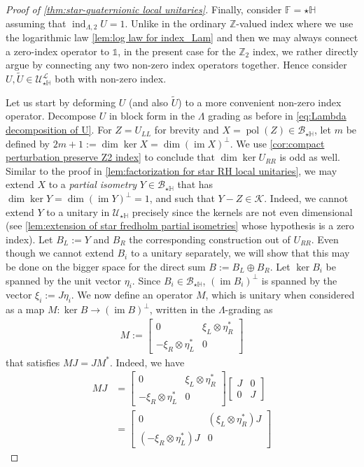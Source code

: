 \documentclass[a4paper,10pt]{article}
\numberwithin{equation}{section}
\theoremstyle{plain}
\theoremstyle{plain}
\theoremstyle{plain}
\theoremstyle{plain}
\theoremstyle{plain}
\theoremstyle{remark}
\theoremstyle{definition}
\theoremstyle{plain}
\newcommand{\ZZ}{\mathbb{Z}}
\newcommand{\FF}{\mathbb{F}}
\newcommand{\calB}{\mathcal{B}}
\newcommand{\calU}{\mathcal{U}}
\newcommand{\calK}{\mathcal{K}}
\newcommand{\calL}{\mathcal{L}}
\newcommand{\ti}[1]{\widetilde{#1}}
\newcommand{\Id}{\mathds{1}}
\newcommand{\HH}{\mathbb{H}}
\newcommand{\findex}{\operatorname{ind}}
\newcommand{\im}{\operatorname{im}}
\newcommand{\eq}[1]{\begin{align*}#1\end{align*}}
\newcommand{\polar}{\operatorname{pol}}
\begin{document}
\begin{proof}[Proof of \cref{thm:star-quaternionic local unitaries}]
		Finally, consider $\FF=\star\HH$ assuming that $\findex_{\Lambda,2} U=1$. Unlike in the ordinary $\ZZ$-valued index where we use the logarithmic law \cref{lem:log law for index_Lam} and then we may always connect a zero-index operator to $\Id$, in the present case for the $\ZZ_2$ index, we rather directly argue by connecting any two non-zero index operators together. Hence consider $U,\widetilde{U}\in\calU_{\star\HH}^\calL$ both with non-zero index.   
		
		Let us start by deforming $U$ (and also $\ti U$) to a more convenient non-zero index operator. Decompose $U$ in block form in the $\Lambda$ grading as before in \cref{eq:Lambda decomposition of U}. For $Z=U_{LL}$ for brevity and $X=\polar(Z)\in\calB_{\star\HH}$, let $m$ be defined by  $2m+1:=\dim\ker X=\dim (\im X)^\perp $. We use \cref{cor:compact perturbation preserve Z2 index} to conclude that $\dim\ker U_{RR}$ is odd as well.
		Similar to the proof in \cref{lem:factorization for star RH local unitaries}, we may extend $X$ to a \emph{partial isometry} $Y\in\calB_{\star\HH}$ that has $\dim \ker Y=\dim (\im Y)^\perp = 1$, and such that $Y-Z\in \calK$. Indeed, we cannot extend $Y$ to a unitary in $\calU_{\star\HH}$ precisely since the kernels are not even dimensional (see \cref{lem:extension of star fredholm partial isometries} whose hypothesis is a zero index). 
		Let $B_{L} := Y$ and $B_{R}$ the corresponding construction out of $U_{RR}$. Even though we cannot extend $B_{i}$ to a unitary separately, we will show that this may be done on the bigger space for the direct sum $B:=B_{L}\oplus B_{R}$. Let $\ker B_{i}$ be spanned by the unit vector $\eta_i$. Since $B_i\in \calB_{\star\HH}$, $(\im B_{i})^\perp$ is spanned by the vector $\xi_i:=J\eta_i$. 
		We now define an operator $M$, which is unitary when considered as a map $M:\ker B\to(\im B)^\perp$, written in the $\Lambda$-grading as \eq{M:=\begin{bmatrix}0 & \xi_L\otimes \eta_R^* \\ -\xi_R \otimes \eta_L^* & 0\end{bmatrix}} that satisfies $MJ=JM^*$. Indeed, we have 
		\eq{MJ 
			& =\begin{bmatrix}0 & \xi_L\otimes \eta_R^* \\ -\xi_R \otimes \eta_L^* & 0\end{bmatrix} \begin{bmatrix}J & 0 \\ 0 & J\end{bmatrix} 
			\\ & =\begin{bmatrix}0 & (\xi_L\otimes \eta_R^*) J \\ (-\xi_R \otimes \eta_L^*) J & 0\end{bmatrix} 
}
\end{proof}
\end{document}
